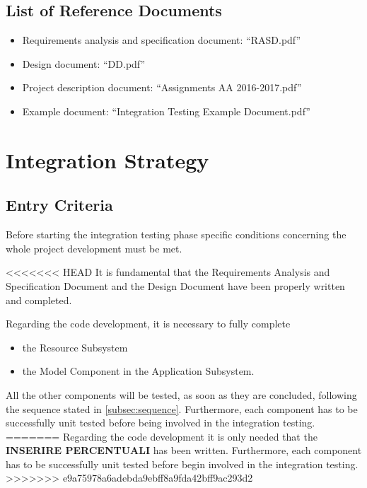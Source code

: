 \documentclass[english]{article}
\begin{document}
\subsection{List of Reference Documents}

\begin{itemize}
	\item{Requirements analysis and specification document: “RASD.pdf”}
	\item{Design document: “DD.pdf”}
	\item{Project description document: “Assignments AA 2016-2017.pdf”}
	\item{Example document: “Integration Testing Example Document.pdf”}
\end{itemize}

\section{Integration Strategy}

\subsection{Entry Criteria}

Before starting the integration testing phase specific conditions concerning the whole project development must be met.

<<<<<<< HEAD
It is fundamental that the Requirements Analysis and Specification Document and the Design Document have been properly written and completed.

Regarding the code development, it is necessary to fully complete 
\begin{itemize}
\item the Resource Subsystem
\item the Model Component in the Application Subsystem.
\end{itemize}
All the other components will be tested, as soon as they are concluded, following the sequence stated in \autoref{subsec:sequence}.
Furthermore, each component has to be successfully unit tested before being involved in the integration testing.
=======
Regarding the code development it is only needed that the \textbf{INSERIRE PERCENTUALI} has been written. Furthermore, each component has to be successfully unit tested before begin involved in the integration testing.
>>>>>>> e9a75978a6adebda9ebff8a9fda42bff9ac293d2
\end{document}
